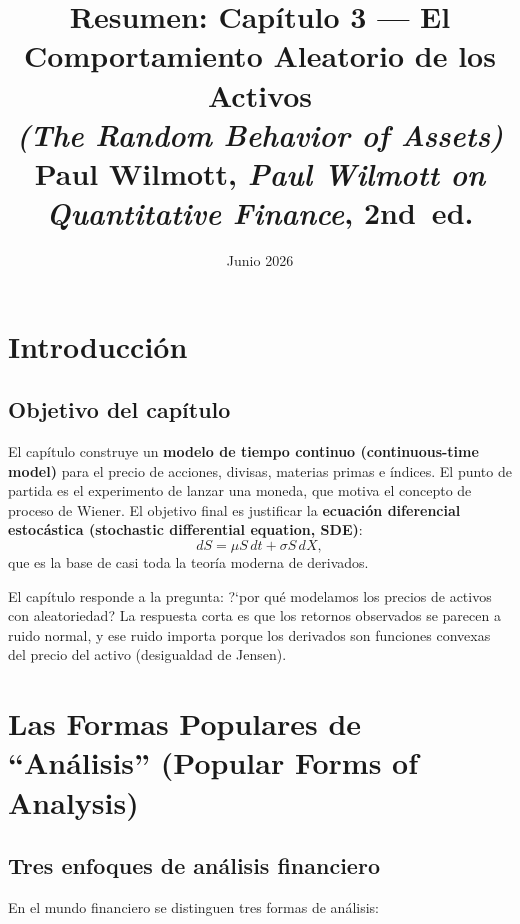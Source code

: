 \documentclass[12pt]{article}
\title{\textbf{Resumen: Cap\'itulo 3 --- El Comportamiento Aleatorio de los Activos}\\
\large \textit{(The Random Behavior of Assets)}\\
\normalsize Paul Wilmott, \textit{Paul Wilmott on Quantitative Finance}, 2nd~ed.}
\author{}
\date{Junio 2026}
\begin{document}
\maketitle
\tableofcontents
\newpage

\section{Introducci\'on}

\subsection{Objetivo del cap\'itulo}

El cap\'itulo construye un \textbf{modelo de tiempo continuo (continuous-time model)}
para el precio de acciones, divisas, materias primas e \'indices.
El punto de partida es el experimento de lanzar una moneda, que motiva el concepto
de proceso de Wiener.
El objetivo final es justificar la \textbf{ecuaci\'on diferencial estoc\'astica
(stochastic differential equation, SDE)}:
\[
  dS = \mu S\,dt + \sigma S\,dX,
\]
que es la base de casi toda la teor\'ia moderna de derivados.

\begin{intuicion}
El cap\'itulo responde a la pregunta: ?`por qu\'e modelamos los precios de activos
con aleatoriedad? La respuesta corta es que los retornos observados se parecen a
ruido normal, y ese ruido importa porque los derivados son funciones convexas del
precio del activo (desigualdad de Jensen).
\end{intuicion}

\section{Las Formas Populares de ``An\'alisis'' (Popular Forms of Analysis)}

\subsection{Tres enfoques de an\'alisis financiero}

En el mundo financiero se distinguen tres formas de an\'alisis:
\end{document}
